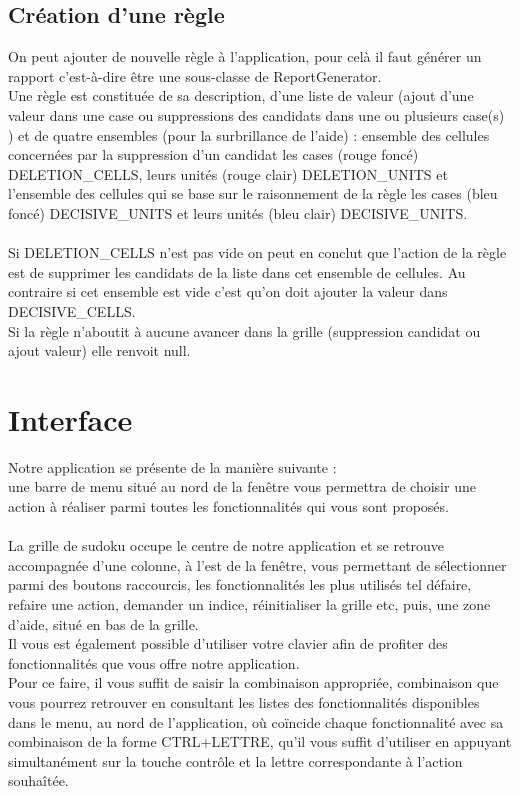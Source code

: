 \subsection{Création d’une règle}
On peut ajouter de nouvelle règle à l’application, pour celà il faut générer un rapport 
c’est-à-dire être une sous-classe de ReportGenerator.\\
Une règle est constituée de sa description, d’une liste de valeur (ajout d’une valeur dans 
une case ou suppressions des candidats dans une ou plusieurs case(s) ) et de quatre ensembles 
(pour la surbrillance de l’aide) : ensemble des cellules concernées par la suppression d’un 
candidat les cases (rouge foncé) DELETION\_CELLS, leurs unités (rouge clair) DELETION\_UNITS et 
l’ensemble des cellules qui se base sur le raisonnement de la règle les cases (bleu foncé) 
DECISIVE\_UNITS et leurs unités (bleu clair) DECISIVE\_UNITS.\\\\
Si DELETION\_CELLS n’est pas vide on peut en conclut que l’action de la règle est de supprimer 
les candidats de la liste dans cet ensemble de cellules. Au contraire si cet ensemble est vide 
c’est qu’on doit ajouter la valeur  dans DECISIVE\_CELLS.\\
Si la règle n’aboutit à aucune avancer dans la grille (suppression candidat ou ajout valeur) 
elle renvoit null.


\newpage
\section{Interface}

Notre application se présente de la manière suivante :\\
une barre de menu situé au nord de la fenêtre vous permettra de choisir 
une action à réaliser parmi toutes les fonctionnalités qui vous sont proposés.\\
\\
La grille de sudoku occupe le centre de notre application et se retrouve accompagnée 
d'une colonne, à l'est de la fenêtre, vous permettant de sélectionner 
parmi des boutons raccourcis, les fonctionnalités les plus utilisés tel défaire, 
refaire une action, demander un indice, réinitialiser la grille etc, puis, 
une zone d'aide, situé en bas de la grille.\\

Il vous est également possible d'utiliser votre clavier afin de profiter 
des fonctionnalités que vous offre notre application.\\
Pour ce faire, il vous suffit de saisir la combinaison appropriée, combinaison 
que vous pourrez retrouver en consultant les listes des fonctionnalités disponibles dans le menu, 
au nord de l'application, où coïncide chaque fonctionnalité avec sa combinaison 
de la forme CTRL+LETTRE, qu'il vous suffit d'utiliser en appuyant simultanément 
sur la touche contrôle et la lettre correspondante à l'action souhaîtée. \\


